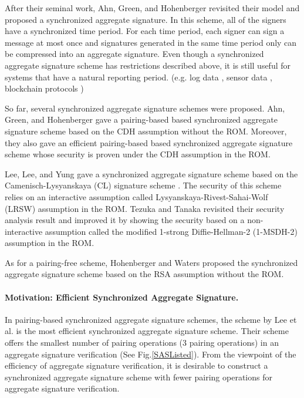 \documentclass[a4paper,11pt]{fullverllncs}
\begin{document}
After their seminal work, Ahn, Green, and Hohenberger \cite{AGH10} revisited their model and proposed a synchronized aggregate signature.
In this scheme, all of the signers have a synchronized time period.
For each time period, each signer can sign a message at most once and signatures generated in the same time period only can be compressed into an aggregate signature.
Even though a synchronized aggregate signature scheme has restrictions described above, it is still useful for systems that have a natural reporting period.
(e.g. log data \cite{AGH10}, sensor data \cite{AGH10}, blockchain protocols \cite{HW18})

So far, several synchronized aggregate signature schemes were proposed.
Ahn, Green, and Hohenberger \cite{AGH10} gave a pairing-based based synchronized aggregate signature scheme based on the CDH assumption without the ROM.
Moreover, they also gave an efficient pairing-based based synchronized aggregate signature scheme whose security is proven under the CDH assumption in the ROM.

Lee, Lee, and Yung \cite{LLY13} gave a synchronized aggregate signature scheme based on the Camenisch-Lysyanskaya (CL) signature scheme \cite{CL04}.
The security of this scheme relies on an interactive assumption called Lysyanskaya-Rivest-Sahai-Wolf (LRSW) assumption \cite{LRSW99} in the ROM.
Tezuka and Tanaka \cite{TT20} revisited their security analysis result and improved it by showing the security based on a non-interactive assumption called the modified 1-strong Diffie-Hellman-2 (1-MSDH-2) assumption \cite{PS18} in the ROM.

As for a pairing-free scheme, Hohenberger and Waters \cite{HW18} proposed the synchronized aggregate signature scheme based on the RSA assumption without the ROM.




\paragraph{\bf Motivation: Efficient Synchronized Aggregate Signature.}
In pairing-based synchronized aggregate signature schemes, the scheme by Lee et al. \cite{LLY13} is the most efficient synchronized aggregate signature scheme.
Their scheme offers the smallest number of pairing operations (3 pairing operations) in an aggregate signature verification (See Fig.\ref{SASListed}). 
From the viewpoint of the efficiency of aggregate signature verification, it is desirable to construct a synchronized aggregate signature scheme with fewer pairing operations for aggregate signature verification.
\end{document}
